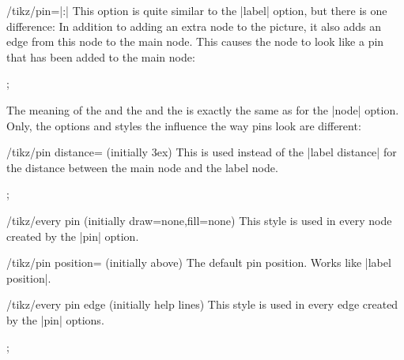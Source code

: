 \begin{key}{/tikz/pin=|:|}
    This option is quite similar to the |label| option, but there is one
    difference: In addition to adding an extra node to the picture, it also
    adds an edge from this node to the main node. This causes the node to look
    like a pin that has been added to the main node:
\begin{codeexample}[]
\tikz \node [circle,fill=blue!50,minimum size=1cm,pin=60:$q_0$] {};
\end{codeexample}

    The meaning of the  and the  and the 
    is exactly the same as for the |node| option. Only, the options and styles
    the influence the way pins look are different:
    \begin{key}{/tikz/pin distance= (initially 3ex)}
        This  is used instead of the |label distance| for the
        distance between the main node and the label node.
\begin{codeexample}[]
\tikz[pin distance=1cm]
  ;
\end{codeexample}
    \end{key}

    \begin{stylekey}{/tikz/every pin (initially {draw=none,fill=none})}
        This style is used in every node created by the |pin| option.
    \end{stylekey}

    \begin{key}{/tikz/pin position= (initially above)}
        The default pin position. Works like |label position|.
    \end{key}

    \begin{stylekey}{/tikz/every pin edge (initially help lines)}
        This style is used in every edge created by the |pin| options.
\begin{codeexample}[preamble={\usetikzlibrary{decorations.pathmorphing}}]
\tikz [pin distance=15mm,
       every pin edge/.style={<-,shorten <=1pt,decorate,
                              decoration={snake,pre length=4pt}}]
  ;
\end{codeexample}
    \end{stylekey}


\end{key}

